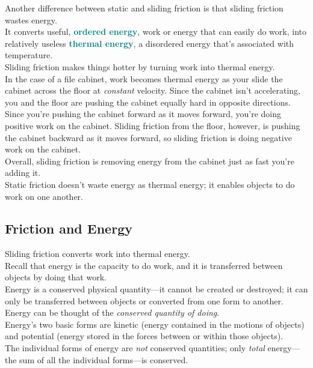 \documentclass[12pt]{article}
\theoremstyle{definition}
\newcommand{\defnterm}[1]{\textbf{\textcolor{teal}{#1}}\index{#1}}
\begin{document}
Another difference between static and sliding friction is that sliding friction wastes energy. \\
It converts useful, \defnterm{ordered energy}, work or energy that can easily do work, into relatively useless \defnterm{thermal energy}, a disordered energy that's associated with temperature. \\
Sliding friction makes things hotter by turning work into thermal energy. \\

In the case of a file cabinet, work becomes thermal energy as your slide the cabinet across the floor at \emph{constant} velocity.
Since the cabinet isn't accelerating, you and the floor are pushing the cabinet equally hard in opposite directions. \\
Since you're pushing the cabinet forward as it moves forward, you're doing positive work on the cabinet.
Sliding friction from the floor, however, is pushing the cabinet backward as it moves forward, so sliding friction is doing negative work on the cabinet. \\
Overall, sliding friction is removing energy from the cabinet just as fast you're adding it. \\

Static friction doesn't waste energy as thermal energy;
it enables objects to do work on one another.

\subsection{Friction and Energy}
Sliding friction converts work into thermal energy. \\

Recall that energy is the capacity to do work, and it is transferred between objects by doing that work. \\
Energy is a conserved physical quantity---it cannot be created or destroyed;
it can only be transferred between objects or converted from one form to another.  \\
Energy can be thought of the \emph{conserved quantity of doing}. \\

Energy's two basic forms are kinetic (energy contained in the motions of objects) and potential (energy stored in the forces between or within those objects). \\
The individual forms of energy are \emph{not} conserved quantities;
only \emph{total} energy---the sum of all the individual forms---is conserved. \\
\end{document}
